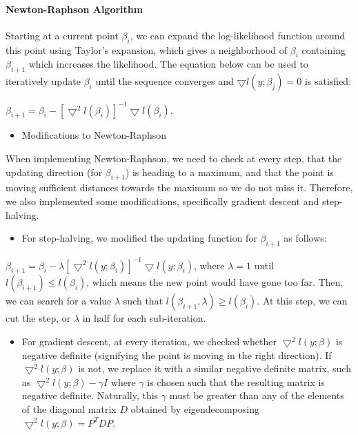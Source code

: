 \documentclass[]{article}
\providecommand{\tightlist}{%
  \setlength{\itemsep}{0pt}\setlength{\parskip}{0pt}}
\let\oldparagraph\paragraph
\renewcommand{\paragraph}[1]{\oldparagraph{#1}\mbox{}}
\begin{document}
\hypertarget{newton-raphson-algorithm}{%
\paragraph{Newton-Raphson Algorithm}\label{newton-raphson-algorithm}}

Starting at a current point \(\beta_{i}\), we can expand the
log-likelihood function around this point using Taylor's expansion,
which gives a neighborhood of \(\beta_{i}\) containing \(\beta_{i+1}\)
which increases the likelihood. The equation below can be used to
iteratively update \(\beta_{i}\) until the sequence converges and
\(\bigtriangledown l(y;\beta_{j}) = 0\) is satisfied:

\(\beta_{i+1} = \beta_{i}- [\bigtriangledown^2 l(\beta_{i})]^{-1} \bigtriangledown l(\beta_{i})\).

\begin{itemize}
\tightlist
\item
  Modifications to Newton-Raphson
\end{itemize}

When implementing Newton-Raphson, we need to check at every step, that
the updating direction (for \(\beta_{i+1}\)) is heading to a maximum,
and that the point is moving sufficient distances towards the maximum so
we do not miss it. Therefore, we also implemented some modifications,
specifically gradient descent and step-halving.

\begin{itemize}
\tightlist
\item
  For step-halving, we modified the updating function for
  \(\beta_{i+1}\) as follows:
\end{itemize}

\(\beta_{i+1} = \beta_{i}-\lambda [\bigtriangledown^2 l(y;\beta_{i})]^{-1} \bigtriangledown l(y;\beta_{i})\),
where \(\lambda = 1\) until \(l(\beta_{i+1}) \leq l(\beta_{i})\), which
means the new point would have gone too far. Then, we can search for a
value \(\lambda\) such that
\(l(\beta_{i+1}, \lambda) \geq l(\beta_{i})\). At this step, we can cut
the step, or \(\lambda\) in half for each sub-iteration.

\begin{itemize}
\tightlist
\item
  For gradient descent, at every iteration, we checked whether
  \(\bigtriangledown^2 l(y;\beta)\) is negative definite (signifying the
  point is moving in the right direction). If
  \(\bigtriangledown^2 l(y;\beta)\) is not, we replace it with a similar
  negative definite matrix, such as
  \(\bigtriangledown^2 l(y;\beta) - \gamma I\) where \(\gamma\) is
  chosen such that the resulting matrix is negative definite. Naturally,
  this \(\gamma\) must be greater than any of the elements of the
  diagonal matrix \(D\) obtained by eigendecomposing
  \(\bigtriangledown^2 l(y;\beta) = P^{T}DP\).
\end{itemize}
\end{document}
